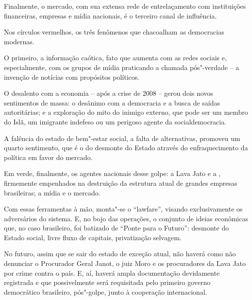 Finalmente, o mercado, com sua extensa rede de entrelaçamento com
instituições financeiras, empresas e mídia nacionais, é o terceiro canal
de influência.

Nos círculos vermelhos, os três fenômenos que chacoalham as democracias
modernas.

O primeiro, a informação caótica, fato que aumenta com as redes sociais
e, especialmente, com os grupos de mídia praticando a chamada
pós"-verdade -- a invenção de notícias com propósitos políticos.

O desalento com a economia -- após a crise de 2008 -- gerou dois novos
sentimentos de massa: o desânimo com a democracia e a busca de saídas
autoritárias; e a exploração do mito do inimigo externo, que pode ser um
membro do Islã, um imigrante indefeso ou um perigoso agente da
socialdemocracia.

A falência do estado de bem"-estar social, a falta de alternativas,
promoveu um quarto sentimento, que é o do desmonte do Estado através do
enfraquecimento da política em favor do mercado.

Em verde, finalmente, os agentes nacionais desse golpe: a Lava Jato e a
, firmemente empenhados na destruição da estrutura atual de grandes
empresas brasileiras; a mídia e o mercado.

Com essas ferramentas à mão, monta"-se o ``lawfare'', visando
exclusivamente os adversários do sistema. E, no bojo das operações, o
conjunto de ideias econômicas que, no caso brasileiro, foi batizado de
``Ponte para o Futuro'': desmonte do Estado social, livre fluxo de
capitais, privatização selvagem.

No futuro, assim que se sair do estado de exceção atual, não haverá como
não denunciar o Procurador Geral Janot, o juiz Moro e os procuradores da
Lava Jato por crime contra o país. E, aí, haverá ampla documentação
devidamente registrada e que possivelmente será requisitada pelo
primeiro governo democrático brasileiro, pós"-golpe, junto à cooperação
internacional.
